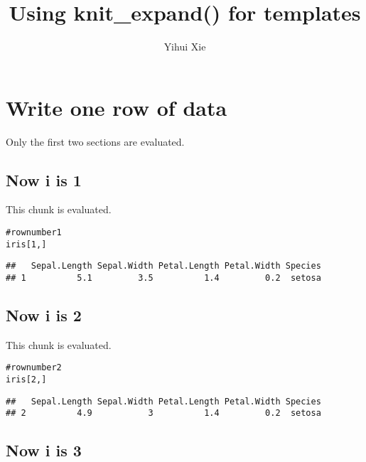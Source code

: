 \documentclass{article}\usepackage[]{graphicx}\usepackage[]{color}
\title{Using knit\_expand() for templates}
\author{Yihui Xie}
\makeatletter
\newcommand{\hlcomment}[1]{\textcolor[rgb]{0.180392156862745,0.6,0.341176470588235}{#1}}%
\newenvironment{kframe}{%
 \def\at@end@of@kframe{}%
 \ifinner\ifhmode%
  \def\at@end@of@kframe{\end{minipage}}%
  \begin{minipage}{\columnwidth}%
 \fi\fi%
 \def\FrameCommand##1{\hskip\@totalleftmargin \hskip-\fboxsep
 \colorbox{shadecolor}{##1}\hskip-\fboxsep
     \hskip-\linewidth \hskip-\@totalleftmargin \hskip\columnwidth}%
 \MakeFramed {\advance\hsize-\width
   \@totalleftmargin\z@ \linewidth\hsize
   \@setminipage}}%
 {\par\unskip\endMakeFramed%
 \at@end@of@kframe}
\newenvironment{knitrout}{}{} %
\makeatother
\begin{document}
\maketitle
\tableofcontents

\section{Write one row of data}
Only the first two sections are evaluated.



\subsection{Now i is 1}

This chunk is evaluated.
\begin{knitrout}
\color{fgcolor}\begin{kframe}
\begin{alltt}
\hlcomment{# row number 1}
iris[1, ]
\end{alltt}
\begin{verbatim}
##   Sepal.Length Sepal.Width Petal.Length Petal.Width Species
## 1          5.1         3.5          1.4         0.2  setosa
\end{verbatim}
\end{kframe}
\end{knitrout}

\subsection{Now i is 2}

This chunk is evaluated.
\begin{knitrout}
\color{fgcolor}\begin{kframe}
\begin{alltt}
\hlcomment{# row number 2}
iris[2, ]
\end{alltt}
\begin{verbatim}
##   Sepal.Length Sepal.Width Petal.Length Petal.Width Species
## 2          4.9           3          1.4         0.2  setosa
\end{verbatim}
\end{kframe}
\end{knitrout}

\subsection{Now i is 3}
\end{document}
